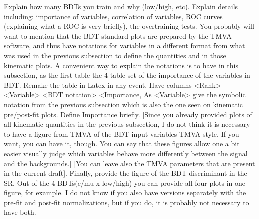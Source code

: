                          Explain how many BDTs you train and why (low/high, etc). 
                Explain details including: importance of variables, correlation of variables, ROC curves
           (explaining what a ROC is very briefly), the overtraining tests. You probably will  want  to 
           mention that the BDT standard plots are prepared by the TMVA software, and thus have
           notations for variables in a different format from what was used in the previous subsection
           to define the quantities and in those kinematic plots. A convenient  way to explain the notations
           is to have in this subsection, as  the first table the 4-table set of the importance of the variables in BDT.
           Remake the table in Latex in any event. Have columns <Rank> <Variable> <BDT notation> <Importance, %
           As <Variable> give the symbolic notation from the previous subsection which is also the one seen
           on kinematic pre/post-fit plots. Define Importance briefly.
           [Since you already provided plots of all kinematic quantities in the previous subsection, I do not  think
           it is necessary to have a figure from TMVA  of  the BDT input variables TMVA-style. If you want,
           you can have it, though. You can say  that these figures allow one a bit easier visually judge
           which variables behave more differently between the  signal and the backgrounds.]
           [You can leave also the TMVA parameters that are present in the current draft].
                Finally, provide the figure of the BDT discriminant in the SR. Out of the 4 BDTs(e/mu x low/high)
           you can provide all four plots in one figure, for example. I do not know if you also have versions
           separately with the pre-fit and post-fit normalizations, but if you do, it is probably not necessary
           to have both.




